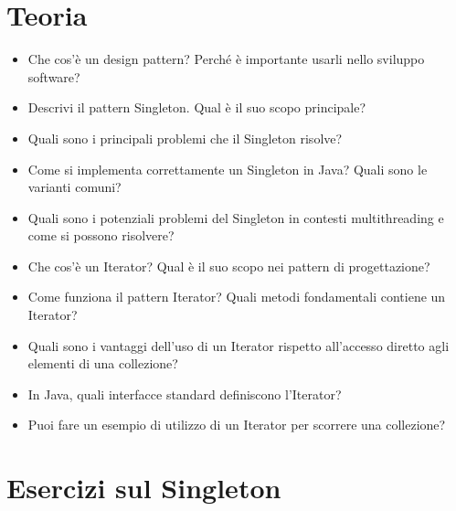 \documentclass{article}
\begin{document}
\section{Teoria}

\begin{itemize}
    \item Che cos'è un design pattern? Perché è importante usarli nello sviluppo software?
    \item Descrivi il pattern Singleton. Qual è il suo scopo principale?
    \item Quali sono i principali problemi che il Singleton risolve?
    \item Come si implementa correttamente un Singleton in Java? Quali sono le varianti comuni?
    \item Quali sono i potenziali problemi del Singleton in contesti multithreading e come si possono risolvere?
    \item Che cos'è un Iterator? Qual è il suo scopo nei pattern di progettazione?
    \item Come funziona il pattern Iterator? Quali metodi fondamentali contiene un Iterator?
    \item Quali sono i vantaggi dell'uso di un Iterator rispetto all'accesso diretto agli elementi di una collezione?
    \item In Java, quali interfacce standard definiscono l'Iterator?
    \item Puoi fare un esempio di utilizzo di un Iterator per scorrere una collezione?
\end{itemize}

\section{Esercizi sul Singleton}
\end{document}

